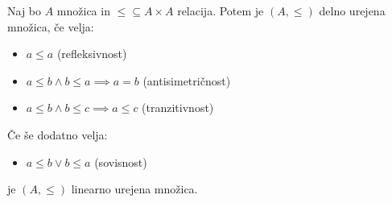 \begin{definicija}
    Naj bo $A$ množica in $\leq \subseteq A \times A$ relacija.
    Potem je $(A, \leq)$ delno urejena množica, če velja:
    \begin{itemize}
        \item $a \leq a$ (refleksivnost)
        \item $a \leq b \wedge b \leq a \implies a = b$ (antisimetričnost)
        \item $a \leq b \wedge b \leq c \implies a \leq c$ (tranzitivnost)
    \end{itemize}
    Če še dodatno velja:
    \begin{itemize}
        \item $a \leq b \vee b \leq a$ (sovisnost)
    \end{itemize}
    je $(A, \leq)$ linearno urejena množica.
\end{definicija}